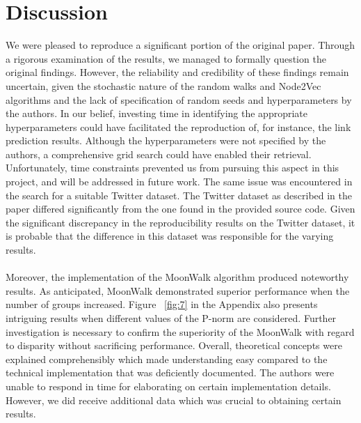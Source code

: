 \section{Discussion}
We were pleased to reproduce a significant portion of the original paper. Through a rigorous examination of the results, we managed to formally question the original findings. However, the reliability and credibility of these findings remain uncertain, given the stochastic nature of the random walks and Node2Vec algorithms and the lack of specification of random seeds and hyperparameters by the authors. 
In our belief, investing time in identifying the appropriate hyperparameters could have facilitated the reproduction of, for instance, the link prediction results. Although the hyperparameters were not specified by the authors, a comprehensive grid search could have enabled their retrieval. Unfortunately, time constraints prevented us from pursuing this aspect in this project, and will be addressed in future work. The same issue was encountered in the search for a suitable Twitter dataset. The Twitter dataset as described in the paper differed significantly from the one found in the provided source code. Given the significant discrepancy in the reproducibility results on the Twitter dataset, it is probable that the difference in this dataset was responsible for the varying results.  \\ \\
Moreover, the implementation of the MoonWalk algorithm produced noteworthy results. As anticipated, MoonWalk demonstrated superior performance when the number of groups increased. Figure ~\ref{fig:7} in the Appendix also presents intriguing results when different values of the P-norm are considered. Further investigation is necessary to confirm the superiority of the MoonWalk with regard to disparity without sacrificing performance. Overall, theoretical concepts were explained comprehensibly which made understanding easy compared to the technical implementation that was deficiently documented. The authors were unable to respond in time for elaborating on certain implementation details. However, we did receive additional data which was crucial to obtaining certain results.


